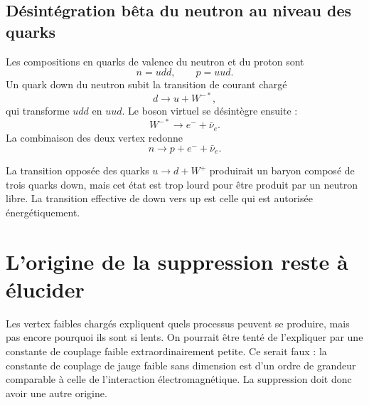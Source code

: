 \subsection{Désintégration bêta du neutron au niveau des quarks}

Les compositions en quarks de valence du neutron et du proton sont
\begin{equation}
n=udd,
\qquad
p=uud.
\end{equation}
Un quark down du neutron subit la transition de courant chargé
\begin{equation}
d\longrightarrow u+W^{-*},
\end{equation}
qui transforme \(udd\) en \(uud\). Le boson virtuel se désintègre ensuite :
\begin{equation}
W^{-*}\longrightarrow e^-+\bar\nu_e.
\end{equation}
La combinaison des deux vertex redonne
\begin{equation}
n\longrightarrow p+e^-+\bar\nu_e.
\end{equation}

La transition opposée des quarks \(u\to d+W^+\) produirait un baryon composé de trois quarks down, mais cet état est trop lourd pour être produit par un neutron libre. La transition effective de down vers up est celle qui est autorisée énergétiquement.

\begin{classroomqa}
\end{classroomqa}

\section{L’origine de la suppression reste à élucider}

Les vertex faibles chargés expliquent quels processus peuvent se produire, mais pas encore pourquoi ils sont si lents. On pourrait être tenté de l’expliquer par une constante de couplage faible extraordinairement petite. Ce serait faux : la constante de couplage de jauge faible sans dimension est d’un ordre de grandeur comparable à celle de l’interaction électromagnétique. La suppression doit donc avoir une autre origine.

